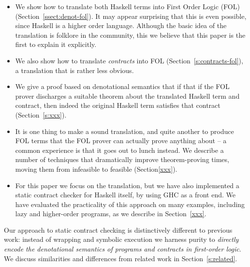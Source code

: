 \begin{itemize}
\item We show how to translate both Haskell terms
into First Order Logic (FOL) (Section~\ref{ssect:denot-fol}).  
It may appear surprising that this 
is even possible, since Haskell is a higher order language.  Although
the basic idea of the translation is folklore in the community,
this we believe that this paper is the first to explain it explicitly.

\item We also show how to translate \emph{contracts} into FOL
      (Section~\ref{s:contracts-fol}), 
      a translation that is rather less obvious.

\item We give a proof based on denotational semantics 
that if that if the FOL prover discharges a 
suitable theorem about the translated Haskell term and contract, 
then indeed the original Haskell term satisfies that contract (Section~\ref{s:xxx}).

\item It is one thing to make a sound translation, and quite another
to produce FOL terms that the FOL prover can actually prove anything
about -- a common experience is that it goes out to lunch instead.  We
describe a number of techniques that dramatically improve
theorem-proving times, moving them from infeasible to feasible (Section\ref{xxx}).

\item For this paper we focus on the
translation, but we have also implemented a static contract checker
for Haskell itself, by using GHC as a front end.  We have evaluated
the practicality of this approach on many examples, including lazy and
higher-order programs, as we describe in Section~\ref{xxx}.  
\end{itemize}
Our approach to static contract checking is distinctively different to
previous work: instead of wrapping and symbolic execution we harness
purity to \emph{directly encode the denotational semantics of programs
and contracts in first-order logic}.  We discuss similarities and differences from
related work in Section~\ref{s:related}.


















